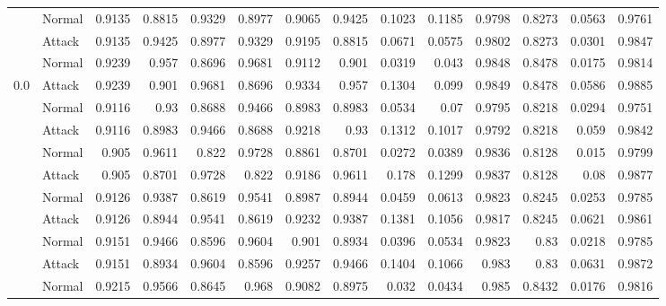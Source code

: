 \begin{tabular}{llrrrrrrrrrrrr}
                & Normal     &     0.9135 &      0.8815 &   0.9329 &        0.8977 &     0.9065 & 0.9425 & 0.1023 & 0.1185 &    0.9798 & 0.8273 & 0.0563 &   0.9761 \\
                & Attack     &     0.9135 &      0.9425 &   0.8977 &        0.9329 &     0.9195 & 0.8815 & 0.0671 & 0.0575 &    0.9802 & 0.8273 & 0.0301 &   0.9847 \\
                & Normal     &     0.9239 &      0.957  &   0.8696 &        0.9681 &     0.9112 & 0.901  & 0.0319 & 0.043  &    0.9848 & 0.8478 & 0.0175 &   0.9814 \\
 0.0            & Attack     &     0.9239 &      0.901  &   0.9681 &        0.8696 &     0.9334 & 0.957  & 0.1304 & 0.099  &    0.9849 & 0.8478 & 0.0586 &   0.9885 \\
                & Normal     &     0.9116 &      0.93   &   0.8688 &        0.9466 &     0.8983 & 0.8983 & 0.0534 & 0.07   &    0.9795 & 0.8218 & 0.0294 &   0.9751 \\
                & Attack     &     0.9116 &      0.8983 &   0.9466 &        0.8688 &     0.9218 & 0.93   & 0.1312 & 0.1017 &    0.9792 & 0.8218 & 0.059  &   0.9842 \\
                & Normal     &     0.905  &      0.9611 &   0.822  &        0.9728 &     0.8861 & 0.8701 & 0.0272 & 0.0389 &    0.9836 & 0.8128 & 0.015  &   0.9799 \\
                & Attack     &     0.905  &      0.8701 &   0.9728 &        0.822  &     0.9186 & 0.9611 & 0.178  & 0.1299 &    0.9837 & 0.8128 & 0.08   &   0.9877 \\
                & Normal     &     0.9126 &      0.9387 &   0.8619 &        0.9541 &     0.8987 & 0.8944 & 0.0459 & 0.0613 &    0.9823 & 0.8245 & 0.0253 &   0.9785 \\
                & Attack     &     0.9126 &      0.8944 &   0.9541 &        0.8619 &     0.9232 & 0.9387 & 0.1381 & 0.1056 &    0.9817 & 0.8245 & 0.0621 &   0.9861 \\
                & Normal     &     0.9151 &      0.9466 &   0.8596 &        0.9604 &     0.901  & 0.8934 & 0.0396 & 0.0534 &    0.9823 & 0.83   & 0.0218 &   0.9785 \\
                & Attack     &     0.9151 &      0.8934 &   0.9604 &        0.8596 &     0.9257 & 0.9466 & 0.1404 & 0.1066 &    0.983  & 0.83   & 0.0631 &   0.9872 \\
                & Normal     &     0.9215 &      0.9566 &   0.8645 &        0.968  &     0.9082 & 0.8975 & 0.032  & 0.0434 &    0.985  & 0.8432 & 0.0176 &   0.9816 \\

\end{tabular}
